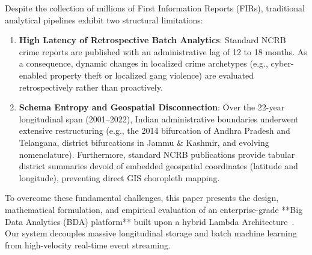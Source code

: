 \documentclass[conference]{IEEEtran}
\begin{document}
Despite the collection of millions of First Information Reports (FIRs), traditional analytical pipelines exhibit two structural limitations:
\begin{enumerate}
    \item \textbf{High Latency of Retrospective Batch Analytics}: Standard NCRB crime reports are published with an administrative lag of 12 to 18 months. As a consequence, dynamic changes in localized crime archetypes (e.g., cyber-enabled property theft or localized gang violence) are evaluated retrospectively rather than proactively.
    \item \textbf{Schema Entropy and Geospatial Disconnection}: Over the 22-year longitudinal span (2001--2022), Indian administrative boundaries underwent extensive restructuring (e.g., the 2014 bifurcation of Andhra Pradesh and Telangana, district bifurcations in Jammu \& Kashmir, and evolving nomenclature). Furthermore, standard NCRB publications provide tabular district summaries devoid of embedded geospatial coordinates (latitude and longitude), preventing direct GIS choropleth mapping.
\end{enumerate}

To overcome these fundamental challenges, this paper presents the design, mathematical formulation, and empirical evaluation of an enterprise-grade **Big Data Analytics (BDA) platform** built upon a hybrid Lambda Architecture~\cite{marz2015big}. Our system decouples massive longitudinal storage and batch machine learning from high-velocity real-time event streaming.
\end{document}
